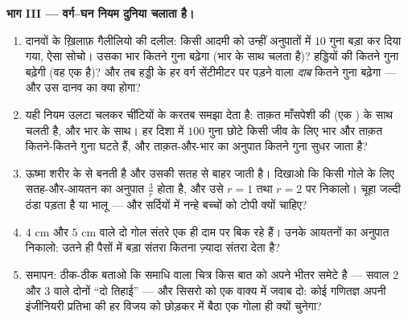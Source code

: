 \begin{problem}
\medskip
\noindent\textbf{भाग III --- वर्ग--घन नियम दुनिया चलाता है।}
\begin{enumerate}[resume]
  \item दानवों के ख़िलाफ़ गैलीलियो की दलील: किसी आदमी को उन्हीं
        अनुपातों में $10$ गुना बड़ा कर दिया गया, ऐसा सोचो। उसका
        भार कितने गुना बढ़ेगा (भार  के साथ चलता है)? हड्डियों
        की  कितने गुना बढ़ेगी (वह एक  है)?
        और तब हड्डी के हर वर्ग सेंटीमीटर पर पड़ने वाला \emph{दाब}
        कितने गुना बढ़ेगा --- और उस दानव का क्या होगा?
  \item यही नियम उलटा चलकर चींटियों के करतब समझा देता है: ताक़त
        माँसपेशी की  (एक ) के साथ चलती है,
        और भार  के साथ। हर दिशा में $100$ गुना छोटे किसी जीव
        के लिए भार और ताक़त कितने-कितने गुना घटते हैं, और
        ताक़त-और-भार का अनुपात कितने गुना सुधर जाता है?
  \item ऊष्मा शरीर के  से बनती है और उसकी सतह से बाहर जाती है।
        दिखाओ कि किसी गोले के लिए सतह-और-आयतन का अनुपात
        $\frac{3}{r}$ होता है, और उसे $r = 1$ तथा $r = 2$ पर
        निकालो। चूहा जल्दी ठंडा पड़ता है या भालू --- और सर्दियों
        में नन्हे बच्चों को टोपी क्यों चाहिए?
  \item $4$ cm और $5$ cm  वाले दो गोल संतरे एक ही दाम पर
        बिक रहे हैं। उनके आयतनों का अनुपात निकालो: उतने ही पैसों
        में बड़ा संतरा कितना ज़्यादा संतरा देता है?
  \item समापन: ठीक-ठीक बताओ कि समाधि वाला चित्र किस बात को अपने
        भीतर समेटे है --- सवाल 2 और 3 वाले दोनों ``दो तिहाई'' ---
        और सिसरो को एक वाक्य में जवाब दो: कोई गणितज्ञ अपनी
        इंजीनियरी प्रतिभा की हर विजय को छोड़कर  में बैठा एक
        गोला ही क्यों चुनेगा?

\end{enumerate}
\end{problem}
